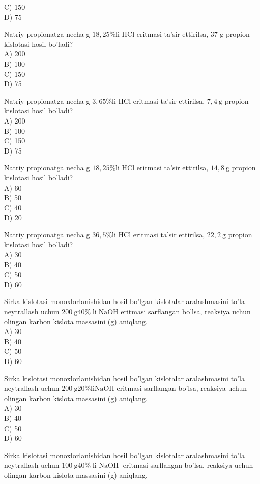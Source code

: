 C) 150\\
D) 75
  \item Natriy propionatga necha g $18,25 \% \mathrm{li}$ HCl eritmasi ta'sir ettirilsa, 37 g propion kislotasi hosil bo'ladi?\\
A) 200\\
B) 100\\
C) 150\\
D) 75
  \item Natriy propionatga necha g $3,65 \% \mathrm{li}$ HCl eritmasi ta'sir ettirilsa, $7,4 \mathrm{~g}$ propion kislotasi hosil bo'ladi?\\
A) 200\\
B) 100\\
C) 150\\
D) 75
  \item Natriy propionatga necha g $18,25 \% \mathrm{li}$ HCl eritmasi ta'sir ettirilsa, $14,8 \mathrm{~g}$ propion kislotasi hosil bo'ladi?\\
A) 60\\
B) 50\\
C) 40\\
D) 20
  \item Natriy propionatga necha g $36,5 \% \mathrm{li}$ HCl eritmasi ta'sir ettirilsa, $22,2 \mathrm{~g}$ propion kislotasi hosil bo'ladi?\\
A) 30\\
B) 40\\
C) 50\\
D) 60
  \item Sirka kislotasi monoxlorlanishidan hosil bo'lgan kislotalar aralashmasini to'la neytrallash uchun $200 \mathrm{~g} 40 \% \operatorname{li} \mathrm{NaOH}$ eritmasi sarflangan bo'lsa, reaksiya uchun olingan karbon kislota massasini (g) aniqlang.\\
A) 30\\
B) 40\\
C) 50\\
D) 60
  \item Sirka kislotasi monoxlorlanishidan hosil bo'lgan kislotalar aralashmasini to'la neytrallash uchun $200 \mathrm{~g} 20 \% \mathrm{li} \mathrm{NaOH}$ eritmasi sarflangan bo'lsa, reaksiya uchun olingan karbon kislota massasini (g) aniqlang.\\
A) 30\\
B) 40\\
C) 50\\
D) 60
  \item Sirka kislotasi monoxlorlanishidan hosil bo'lgan kislotalar aralashmasini to'la neytrallash uchun $100 \mathrm{~g} 40 \% \operatorname{li~NaOH}$ eritmasi sarflangan bo'lsa, reaksiya uchun olingan karbon kislota massasini (g) aniqlang.\\
